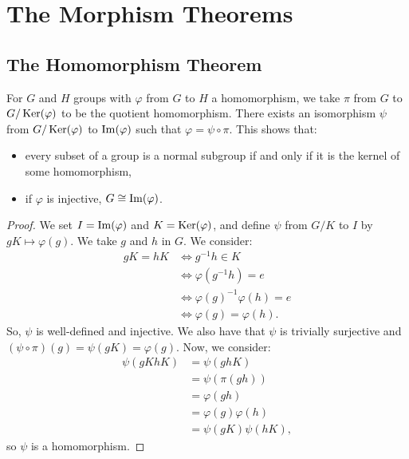 \section{The Morphism Theorems}

\subsection{The Homomorphism Theorem} \label{2.19} \label{2.20}

For $G$ and $H$ groups with $\varphi$ from $G$ to $H$ a homomorphism, we take 
$\pi$ from $G$ to $G / \operatorname{Ker}(\varphi)$ to be the quotient homomorphism.
There exists an isomorphism $\psi$ from $G / \operatorname{Ker}(\varphi)$ to $\operatorname{Im}(\varphi)$
such that $\varphi = \psi \circ \pi$.
This shows that: \begin{itemize}
    \item every subset of a group is a normal subgroup if and only if
    it is the kernel of some homomorphism,
    \item if $\varphi$ is injective, $G \cong \operatorname{Im}(\varphi)$.
\end{itemize}

\begin{proof}
    We set $I = \operatorname{Im}(\varphi)$ and $K = \operatorname{Ker}(\varphi)$, and define 
    $\psi$ from $G / K$ to $I$ by $gK \mapsto \varphi(g)$. 
    We take $g$ and $h$ in $G$. We consider:
    \begin{align*}
        gK = hK 
        &\Longleftrightarrow g^{-1}h \in K \\
        &\Longleftrightarrow \varphi(g^{-1}h) = e \\
        &\Longleftrightarrow \varphi(g)^{-1}\varphi(h) = e \\
        &\Longleftrightarrow \varphi(g) = \varphi(h).
    \end{align*} So, $\psi$ is well-defined and injective.
    We also have that $\psi$ is trivially surjective and
    $(\psi \circ \pi)(g) = \psi(gK) = \varphi(g)$.
    Now, we consider: \begin{align*}
        \psi(gKhK)
        &= \psi(ghK) \\
        &= \psi(\pi(gh)) \\
        &= \varphi(gh) \\
        &= \varphi(g)\varphi(h) \\
        &= \psi(gK)\psi(hK),
    \end{align*} so $\psi$ is a homomorphism.
\end{proof}

